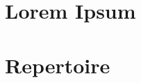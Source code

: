 



\begin{titlingpage}
\titleTH
\end{titlingpage}
\pagestyle{simple}
\tableofcontents

\chapter{Lorem Ipsum}


\chapter{Repertoire}

\clearpage



